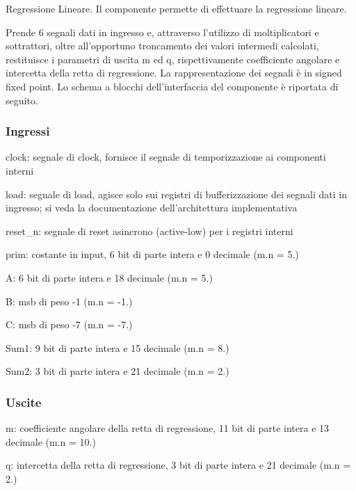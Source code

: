 Regressione Lineare. Il componente permette di effettuare la regressione lineare.

Prende 6 segnali dati in ingresso e, attraverso l'utilizzo di moltiplicatori e sottrattori, oltre all'opportuno troncamento dei valori intermedi calcolati, restituisce i parametri di uscita m ed q, rispettivamente coefficiente angolare e intercetta della retta di regressione. La rappresentazione dei segnali è in signed fixed point. Lo schema a blocchi dell'interfaccia del componente è riportata di seguito.  \subsubsection*{Ingressi}


\begin{DoxyItemize}
\item clock\+: segnale di clock, fornisce il segnale di temporizzazione ai componenti interni
\item load\+: segnale di load, agisce solo sui registri di bufferizzazione dei segnali dati in ingresso; si veda la documentazione dell'architettura implementativa
\item reset\+\_\+n\+: segnale di reset asincrono (active-\/low) per i registri interni
\item prim\+: costante in input, 6 bit di parte intera e 0 decimale (m.\+n = 5.)
\item A\+: 6 bit di parte intera e 18 decimale (m.\+n = 5.)
\item B\+: msb di peso -\/1 (m.\+n = -\/1.)
\item C\+: msb di peso -\/7 (m.\+n = -\/7.)
\item Sum1\+: 9 bit di parte intera e 15 decimale (m.\+n = 8.)
\item Sum2\+: 3 bit di parte intera e 21 decimale (m.\+n = 2.)
\end{DoxyItemize}

\subsubsection*{Uscite}


\begin{DoxyItemize}
\item m\+: coefficiente angolare della retta di regressione, 11 bit di parte intera e 13 decimale (m.\+n = 10.)
\item q\+: intercetta della retta di regressione, 3 bit di parte intera e 21 decimale (m.\+n = 2.)
\end{DoxyItemize}


